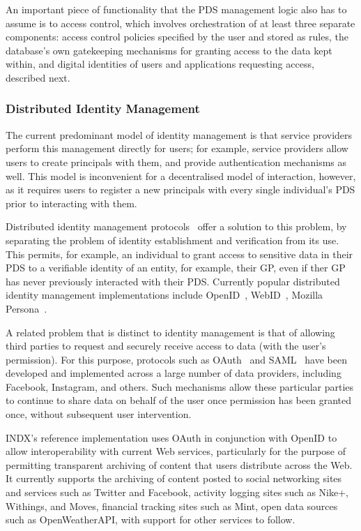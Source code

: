 \documentclass[graybox]{svmult}
\begin{document}
An important piece of functionality that the PDS management logic also has to assume is to access control, which involves orchestration of at least three separate components: access control policies specified by the user and stored as rules,  the database’s own gatekeeping mechanisms for granting access to the data kept within, and digital identities of users and applications requesting access, described next.

\subsubsection{Distributed Identity Management}
The current predominant model of identity management is that service providers perform this management directly for users; for example, service providers allow users to create principals with them, and provide authentication mechanisms as well.  This model is inconvenient for a decentralised model of interaction, however, as it requires users to register a new principals with every single individual’s PDS prior to interacting with them.

Distributed identity management protocols~\cite{koshutanski2007distributed} offer a solution to this problem, by separating the problem of identity establishment and verification from its use.  This permits, for example, an individual to grant access to sensitive data in their PDS to a verifiable identity of an entity, for example, their GP, even if ther GP has never previously interacted with their PDS.  Currently popular distributed identity management implementations include OpenID~\cite{recordon2006openid}, WebID~\cite{huang2000webid}, Mozilla Persona~\cite{williams2013sasl}.

A related problem that is distinct to identity management is that of allowing third parties to request and securely receive access to data (with the user’s permission).  For this purpose, protocols such as OAuth~\cite{hardt2012oauth} and SAML~\cite{armando2008formal} have been developed and implemented across a large number of data providers, including Facebook, Instagram, and others.  Such mechanisms allow these particular parties to continue to share data on behalf of the user once permission has been granted once, without subsequent user intervention.  

INDX’s reference implementation uses OAuth in conjunction with OpenID to allow interoperability with current Web services, particularly for the purpose of permitting transparent archiving of content that users distribute across the Web.  It currently supports the archiving of content posted to social networking sites and services such as Twitter and Facebook, activity logging sites such as Nike+, Withings, and Moves,  financial tracking sites such as Mint, open data sources such as OpenWeatherAPI, with support for other services to follow.
\end{document}
